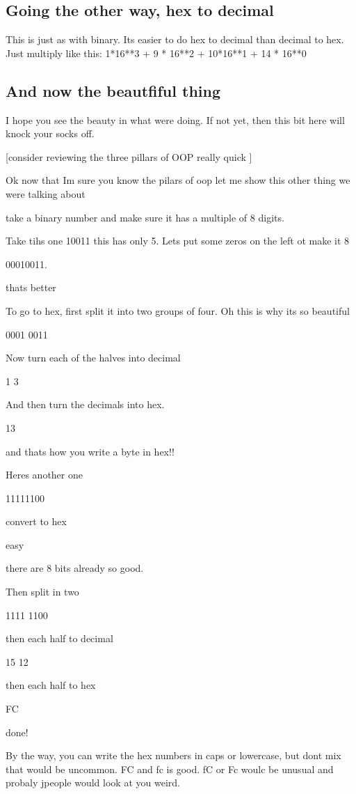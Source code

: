 \documentclass[12pt]{article}
\begin{document}
\subsection{Going the other way, hex to decimal}
This is just as with binary. Its easier to do hex to decimal than decimal to
hex. Just multiply like this: 1*16**3 + 9 * 16**2 + 10*16**1 + 14 * 16**0

\subsection{And now the beautfiful thing}
I hope you see the beauty in what were doing. If not yet, then this bit here
will knock your socks off.

[consider reviewing the three pillars of OOP really quick ]

Ok now that Im sure you know the pilars of oop let me show this other thing we
were talking about


take a binary number and make sure it has a multiple of 8 digits. 

Take tihs one 10011 this has only 5. Lets put some zeros on the left ot make it
8

00010011. 

thats better

To go to hex, first split it into two groups of four. Oh this is why its so
beautiful

0001    0011


Now turn each of the halves into decimal


1       3

And then turn the decimals into hex.

13

and thats how you write a byte in hex!!

Heres another one

11111100

convert to hex

easy

there are 8 bits already so good.

Then split in two

1111 1100


then each half to decimal

15   12


then each half to hex

FC


done!

By the way, you can write the hex numbers in caps or lowercase, but dont mix
that would be uncommon. FC and fc is good. fC or Fc woulc be unusual and probaly
jpeople would look at you weird.
\end{document}
